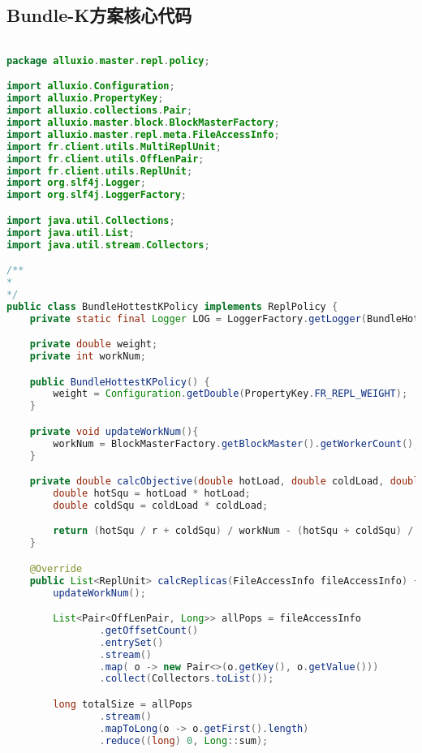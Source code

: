 \begin{Appendix}

\chapter{Bundle-K方案核心代码}
\label{appendix:bundle-k-code}

\begin{lstlisting}[language=java]

package alluxio.master.repl.policy;

import alluxio.Configuration;
import alluxio.PropertyKey;
import alluxio.collections.Pair;
import alluxio.master.block.BlockMasterFactory;
import alluxio.master.repl.meta.FileAccessInfo;
import fr.client.utils.MultiReplUnit;
import fr.client.utils.OffLenPair;
import fr.client.utils.ReplUnit;
import org.slf4j.Logger;
import org.slf4j.LoggerFactory;

import java.util.Collections;
import java.util.List;
import java.util.stream.Collectors;

/**
*
*/
public class BundleHottestKPolicy implements ReplPolicy {
    private static final Logger LOG = LoggerFactory.getLogger(BundleHottestKPolicy.class);

    private double weight;
    private int workNum;

    public BundleHottestKPolicy() {
        weight = Configuration.getDouble(PropertyKey.FR_REPL_WEIGHT);
    }

    private void updateWorkNum(){
        workNum = BlockMasterFactory.getBlockMaster().getWorkerCount();
    }

    private double calcObjective(double hotLoad, double coldLoad, double hotSize, int r){
        double hotSqu = hotLoad * hotLoad;
        double coldSqu = coldLoad * coldLoad;

        return (hotSqu / r + coldSqu) / workNum - (hotSqu + coldSqu) / (workNum * workNum) + weight * r * hotSize;
    }

    @Override
    public List<ReplUnit> calcReplicas(FileAccessInfo fileAccessInfo) {
        updateWorkNum();

        List<Pair<OffLenPair, Long>> allPops = fileAccessInfo
                .getOffsetCount()
                .entrySet()
                .stream()
                .map( o -> new Pair<>(o.getKey(), o.getValue()))
                .collect(Collectors.toList());

        long totalSize = allPops
                .stream()
                .mapToLong(o -> o.getFirst().length)
                .reduce((long) 0, Long::sum);


\end{lstlisting}
\end{Appendix}
